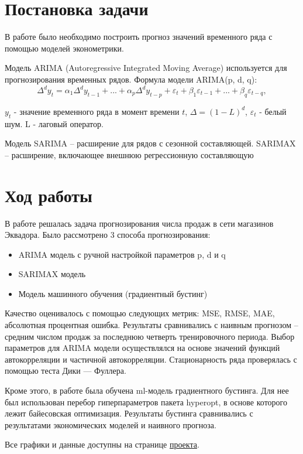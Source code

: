 \documentclass[10pt,a4paper]{article}
\begin{document}
	

\section{Постановка задачи}

В работе было необходимо построить прогноз значений временного ряда с помощью моделей эконометрики. 

Модель ARIMA (Autoregressive Integrated Moving Average) используется для прогнозирования временных рядов.
Формула модели ARIMA(p, d, q):
$$
\Delta^d y_t = \alpha_1 \Delta^d y_{t-1} + ... + \alpha_p\Delta^dy_{t-p} + \varepsilon_t + \beta_1\varepsilon_{t-1} + ... + \beta_q\varepsilon_{t-q},
$$

$y_t$ - значение временного ряда в момент времени $t$, $\Delta = (1 - L)^d$, $\varepsilon_t$ - белый шум. L - лаговый оператор.

Модель SARIMA – расширение для рядов с сезонной составляющей. SARIMAX – расширение, включающее внешнюю регрессионную составляющую


\section{Ход работы}
В работе решалась задача прогнозирования числа продаж в сети магазинов Эквадора. Было рассмотрено 3 способа прогнозирования:
\begin{itemize}
	\item ARIMA модель с ручной настройкой параметров p, d и q
	\item SARIMAX модель
	\item Модель машинного обучения (градиентный бустинг)
\end{itemize}


Качество оценивалось с помощью следующих метрик: MSE, RMSE, MAE, абсолютная процентная ошибка. 
Результаты сравнивались с наивным прогнозом -- средним числом продаж за последнюю четверть тренировочного периода. Выбор параметров для ARIMA модели осуществлялся на основе значений функций автокорреляции и частичной автокорреляции. Стационарность ряда проверялась с помощью теста  Дики — Фуллера.

Кроме этого, в работе была обучена ml-модель градиентного бустинга. Для нее был использован перебор гиперпараметров пакета hyperopt, в основе которого лежит байесовская оптимизация. Результаты бустинга сравнивались с результатами экономических моделей и наивного прогноза. 

Все графики и данные доступны на странице  
\href{https://github.com/MaximKiryakin/Vega/tree/main/%D0%A4%D0%B8%D0%BD%D0%B0%D0%BD%D1%81%D0%BE%D0%B2%D0%B0%D1%8F%20%D1%8D%D0%BA%D0%BE%D0%BD%D0%BE%D0%BC%D0%B5%D1%82%D1%80%D0%B8%D0%BA%D0%B0/%D0%9F%D1%80%D0%BE%D0%B5%D0%BA%D1%82%201}{проекта}.
\end{document}
